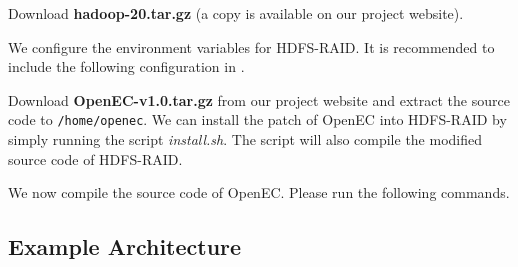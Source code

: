 \documentclass[letterpaper,12pt]{article}
\newcommand{\openec}{{\sf\small OpenEC}\xspace}
\begin{document}
Download {\bf hadoop-20.tar.gz} (a copy is available on our project website).

\begin{center}
\noindent{}
\end{center}

We configure the environment variables for HDFS-RAID. It is recommended to
include the following configuration in .

\begin{center}
\noindent{}
\end{center}

Download {\bf OpenEC-v1.0.tar.gz} from our project website and extract the
source code to {\tt /home/openec}.  We can install the patch of \openec into
HDFS-RAID by simply running the script {\sl install.sh}.  The script will also
compile the modified source code of HDFS-RAID.

\begin{center}
\noindent{}
\end{center}

We now compile the source code of \openec. Please run the following commands.

\begin{center}
\noindent{}
\end{center}

\subsection{Example Architecture}
\end{document}
